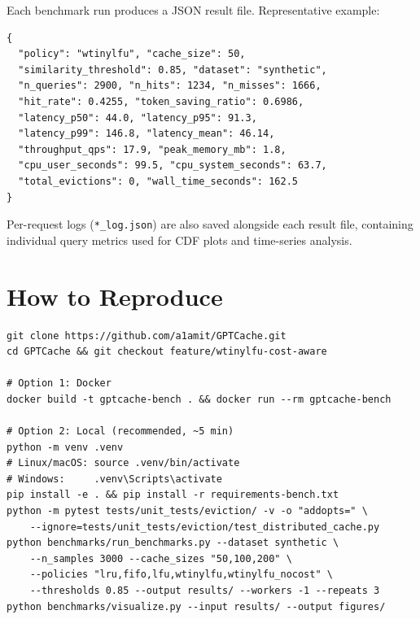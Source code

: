 \documentclass[11pt,a4paper]{article}
\begin{document}
Each benchmark run produces a JSON result file. Representative example:

\begin{lstlisting}
{
  "policy": "wtinylfu", "cache_size": 50,
  "similarity_threshold": 0.85, "dataset": "synthetic",
  "n_queries": 2900, "n_hits": 1234, "n_misses": 1666,
  "hit_rate": 0.4255, "token_saving_ratio": 0.6986,
  "latency_p50": 44.0, "latency_p95": 91.3,
  "latency_p99": 146.8, "latency_mean": 46.14,
  "throughput_qps": 17.9, "peak_memory_mb": 1.8,
  "cpu_user_seconds": 99.5, "cpu_system_seconds": 63.7,
  "total_evictions": 0, "wall_time_seconds": 162.5
}
\end{lstlisting}

\noindent Per-request logs (\texttt{*\_log.json}) are also saved alongside each result file, containing individual query metrics used for CDF plots and time-series analysis.

\newpage
\section{How to Reproduce}

\begin{lstlisting}
git clone https://github.com/a1amit/GPTCache.git
cd GPTCache && git checkout feature/wtinylfu-cost-aware

# Option 1: Docker
docker build -t gptcache-bench . && docker run --rm gptcache-bench

# Option 2: Local (recommended, ~5 min)
python -m venv .venv
# Linux/macOS: source .venv/bin/activate
# Windows:     .venv\Scripts\activate
pip install -e . && pip install -r requirements-bench.txt
python -m pytest tests/unit_tests/eviction/ -v -o "addopts=" \
    --ignore=tests/unit_tests/eviction/test_distributed_cache.py
python benchmarks/run_benchmarks.py --dataset synthetic \
    --n_samples 3000 --cache_sizes "50,100,200" \
    --policies "lru,fifo,lfu,wtinylfu,wtinylfu_nocost" \
    --thresholds 0.85 --output results/ --workers -1 --repeats 3
python benchmarks/visualize.py --input results/ --output figures/
\end{lstlisting}
\end{document}
